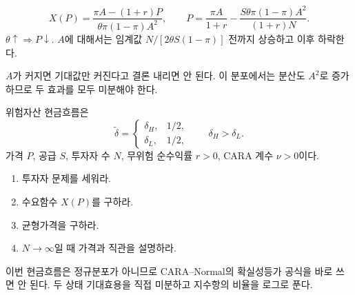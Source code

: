 \begin{answerbox}
\[
X(P)=\frac{\pi A-(1+r)P}{\theta\pi(1-\pi)A^2},
\qquad
P=\frac{\pi A}{1+r}-\frac{S\theta\pi(1-\pi)A^2}{(1+r)N}.
\]
$\theta\uparrow\Rightarrow P\downarrow$. $A$에 대해서는 임계값 $N/[2\theta S(1-\pi)]$ 전까지 상승하고 이후 하락한다.
\end{answerbox}

\begin{warningbox}
$A$가 커지면 기대값만 커진다고 결론 내리면 안 된다. 이 분포에서는 분산도 $A^2$로 증가하므로 두 효과를 모두 미분해야 한다.
\end{warningbox}

\begin{officialbox}
위험자산 현금흐름은
\[
\widetilde\delta=
\begin{cases}
\delta_H,&1/2,\\
\delta_L,&1/2,
\end{cases}
\qquad \delta_H>\delta_L.
\]
가격 $P$, 공급 $S$, 투자자 수 $N$, 무위험 순수익률 $r>0$, CARA 계수 $\nu>0$이다.
\begin{enumerate}[label=(\alph*)]
\item 투자자 문제를 세워라.
\item 수요함수 $X(P)$를 구하라.
\item 균형가격을 구하라.
\item $N\to\infty$일 때 가격과 직관을 설명하라.
\end{enumerate}
\end{officialbox}

\begin{strategybox}
이번 현금흐름은 정규분포가 아니므로 CARA--Normal의 확실성등가 공식을 바로 쓰면 안 된다. 두 상태 기대효용을 직접 미분하고 지수항의 비율을 로그로 푼다.
\end{strategybox}

